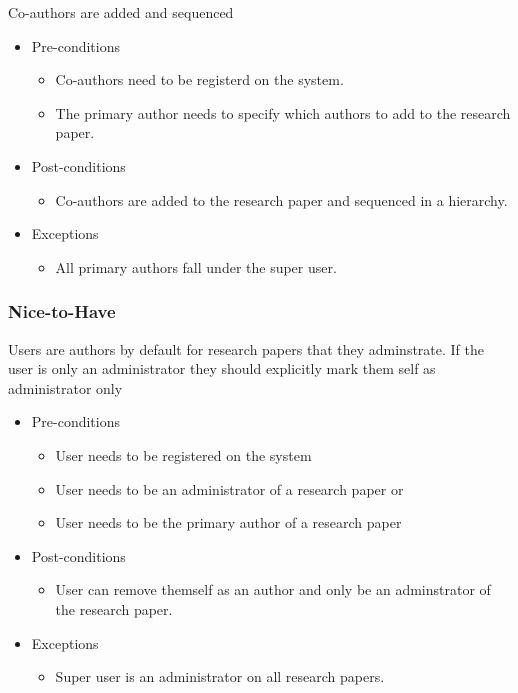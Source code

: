 \documentclass[a4paper,12pt]{report}
\begin{document}
	Co-authors are added and sequenced
	\begin{itemize}
		\item Pre-conditions
			\begin{itemize}
				\item Co-authors need to be registerd on the system.
				\item The primary author needs to specify which authors to add to the research paper.
			\end{itemize}
		\item Post-conditions
			\begin{itemize}
				\item Co-authors are added to the research paper and sequenced in a hierarchy.
			\end{itemize}
		\item Exceptions
			\begin{itemize}
				\item All primary authors fall under the super user.
			\end{itemize}
	\end{itemize}

\subsubsection{Nice-to-Have}
	Users are authors by default for research papers that they adminstrate. If the user is only an administrator they should explicitly mark them self as administrator only
	\begin{itemize}
		\item Pre-conditions
			\begin{itemize}
				\item User needs to be registered on the system
				\item User needs to be an administrator of a research paper or
				\item User needs to be the primary author of a research paper
			\end{itemize}
		\item Post-conditions
			\begin{itemize}
				\item User can remove themself as an author and only be an adminstrator of the research paper.
			\end{itemize}
		\item Exceptions
			\begin{itemize}
				\item Super user is an administrator on all research papers.
			\end{itemize}
	\end{itemize}
\end{document}
